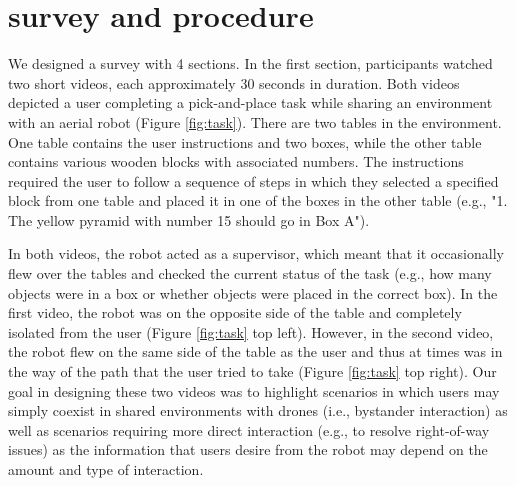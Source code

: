 \documentclass[letterpaper, 10 pt, conference]{ieeeconf}  %
\begin{document}
\section{survey and procedure}
    We designed a survey with 4 sections. In the first section, participants watched two short videos, each approximately 30 seconds in duration. Both videos depicted a user completing a pick-and-place task while sharing an environment with an aerial robot (Figure \ref{fig:task}). There are two tables in the environment. One table contains the user instructions and two boxes, while the other table contains various wooden blocks with associated numbers. The instructions required the user to follow a sequence of steps in which they selected a specified block from one table and placed it in one of the boxes in the other table (e.g., "1. The yellow pyramid with number 15 should go in Box A"). 
    
    In both videos, the robot acted as a supervisor, which meant that it occasionally flew over the tables and checked the current status of the task (e.g., how many objects were in a box or whether objects were placed in the correct box). In the first video, the robot was on the opposite side of the table and completely isolated from the user (Figure \ref{fig:task} top left). However, in the second video, the robot flew on the same side of the table as the user and thus at times was in the way of the path that the user tried to take (Figure \ref{fig:task} top right). Our goal in designing these two videos was to highlight scenarios in which users may simply coexist in shared environments with drones (i.e., bystander interaction) as well as scenarios requiring more direct interaction (e.g., to resolve right-of-way issues) as the information that users desire from the robot may depend on the amount and type of interaction. %
    
\end{document}
